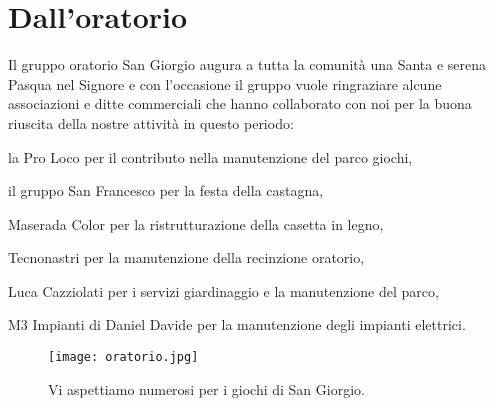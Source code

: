 \section{Dall'oratorio}

Il gruppo oratorio San Giorgio augura a tutta la comunità una Santa e serena Pasqua nel Signore e con l'occasione il gruppo vuole ringraziare alcune associazioni e ditte commerciali che hanno collaborato con noi per la buona riuscita della nostre attività in questo periodo:

la Pro Loco per il contributo nella manutenzione del parco giochi,

il gruppo San Francesco per la festa della castagna,

Maserada Color per la ristrutturazione della casetta in legno,

Tecnonastri per la manutenzione della recinzione oratorio,

Luca Cazziolati per i servizi giardinaggio e la manutenzione del parco,

M3 Impianti di Daniel Davide per la manutenzione degli impianti elettrici.


\vspace*{\fill}
\begin{figure}[h]
    \centering
    \texttt{[image: oratorio.jpg]}
    \caption{Vi aspettiamo numerosi per i giochi di San Giorgio.}
\end{figure}
